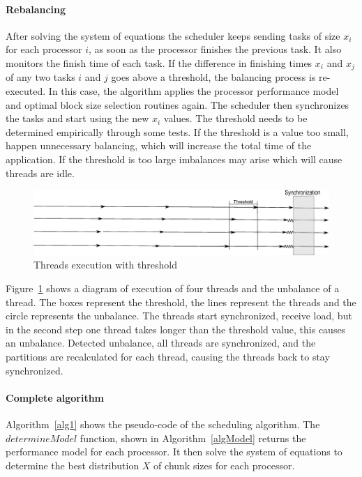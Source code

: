 \documentclass[journal]{IEEEtran}
\begin{document}
\vspace{0.2cm}
\paragraph*{Rebalancing} After solving the system of equations the scheduler keeps
sending tasks of size $x_i$ for each processor $i$, as soon as the processor
finishes the previous task. It also monitors the finish time of each task. If
the difference in finishing times $x_i$ and $x_j$ of any two tasks $i$ and $j$
goes above a threshold, the balancing process is re-executed. In this case, the
algorithm applies the processor performance model and optimal block size
selection routines again. The scheduler then synchronizes the tasks and start
using the new $x_i$ values. The threshold needs to be determined empirically through some tests. If the threshold is a value too small, happen unnecessary balancing, which will increase the total time of the application. If the threshold is too large imbalances may arise which will cause threads are idle.

\begin{figure}[!t]
	\centering
			\includegraphics[scale=0.24]{DiagramaArtigo.eps}
	\caption{Threads execution with threshold}
	\label{fig:Diagrama}
\end{figure}

Figure~\ref{fig:Diagrama} shows a diagram of execution of four threads and the unbalance of a thread. The boxes represent the threshold, the lines represent the threads and the circle represents the unbalance. The threads start synchronized, receive load, but in the second step one thread takes longer than the threshold value, this causes an unbalance. Detected unbalance, all threads are synchronized, and the partitions are recalculated for each thread, causing the threads back to stay synchronized. 


\vspace{0.2cm}
\paragraph*{Complete algorithm} Algorithm~\ref{alg1} shows the pseudo-code of 
the scheduling algorithm. The $determineModel$ function, shown in
Algorithm~\ref{algModel} returns the performance model for each processor. It
then solve the system of equations to determine the best distribution $X$ of
chunk sizes for each processor. 
\end{document}
